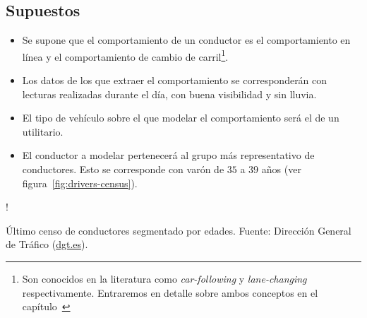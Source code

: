 \subsection{Supuestos}

\begin{itemize}
	\item Se supone que el comportamiento de un conductor es el comportamiento en línea y el comportamiento de cambio de carril\footnote{Son conocidos en la literatura como \textit{car-following} y \textit{lane-changing} respectivamente. Entraremos en detalle sobre ambos conceptos en el capítulo~}.
	\item Los datos de los que extraer el comportamiento se corresponderán con lecturas realizadas durante el día, con buena visibilidad y sin lluvia.
	\item El tipo de vehículo sobre el que modelar el comportamiento será el de un utilitario.
	\item El conductor a modelar pertenecerá al grupo más representativo de conductores. Esto se corresponde con varón de $35$ a $39$ años (ver figura~\ref{fig:drivers-census}).
\end{itemize}

\begin{marginfigure}
	\resizebox {\linewidth} {!} {
	}
	\caption{Último censo de conductores segmentado por edades. Fuente: Dirección General de Tráfico (\url{dgt.es}).}
	\label{fig:drivers-census}
\end{marginfigure}
